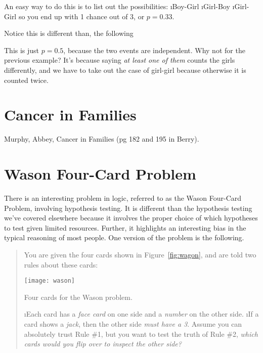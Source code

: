 \documentclass[12pt]{tufte-book}
\begin{document}

An easy way to do this is to list out the possibilities:
\bi
\i Boy-Girl
\i Girl-Boy
\i Girl-Girl
\ei 
so you end up with 1 chance out of 3, or $p=0.33$.

Notice this is different than, the following


This is just $p=0.5$, because the two events are independent.  Why not for the previous example?  It's because saying {\em at least one of them} counts the girls differently, and we have to take out the case of girl-girl because otherwise it is counted twice.  

\section{Cancer in Families}

Murphy, Abbey, Cancer in Families (pg 182 and 195 in Berry).  

\section{Wason Four-Card Problem}

There is an interesting problem in logic, referred to as the Wason Four-Card Problem\cite{Wason:1971fk}, involving hypothesis testing.  It is different than the hypothesis testing we've covered elsewhere because it involves the proper choice of which hypotheses to test given limited resources.  Further, it highlights an interesting bias in the typical reasoning of most people.  One version of the problem is the following.

\begin{quote}
You are given the four cards shown in Figure~\ref{fig:wagon}, and are told two rules about these cards:

\begin{marginfigure}
\texttt{[image: wason]}
\caption{Four cards for the Wason problem.}\label{fig:wagon}
\end{marginfigure}
\be
\i Each card has a {\em face card} on one side and a {\em number} on the other side.
\i If a card shows a {\em jack}, then the other side {\em must have a 3}.
\ee
Assume you can absolutely trust Rule \#1, but you want to test the truth of Rule \#2, {\em which cards would you flip over to inspect the other side?}
\end{quote}
\end{document}
